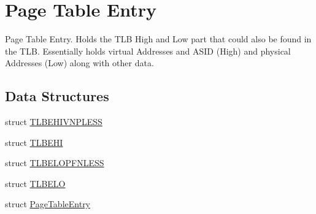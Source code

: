\hypertarget{group___v_m_m___p_t_e}{
\section{Page Table Entry}
\label{group___v_m_m___p_t_e}
}
Page Table Entry. Holds the TLB High and Low part that could also be found in the TLB. Essentially holds virtual Addresses and ASID (High) and physical Addresses (Low) along with other data.  


\subsection*{Data Structures}
\begin{CompactItemize}
\item 
struct \hyperlink{struct_t_l_b_e_h_i_v_n_p_l_e_s_s}{TLBEHIVNPLESS}
\item 
struct \hyperlink{struct_t_l_b_e_h_i}{TLBEHI}
\item 
struct \hyperlink{struct_t_l_b_e_l_o_p_f_n_l_e_s_s}{TLBELOPFNLESS}
\item 
struct \hyperlink{struct_t_l_b_e_l_o}{TLBELO}
\item 
struct \hyperlink{struct_page_table_entry}{PageTableEntry}
\end{CompactItemize}
